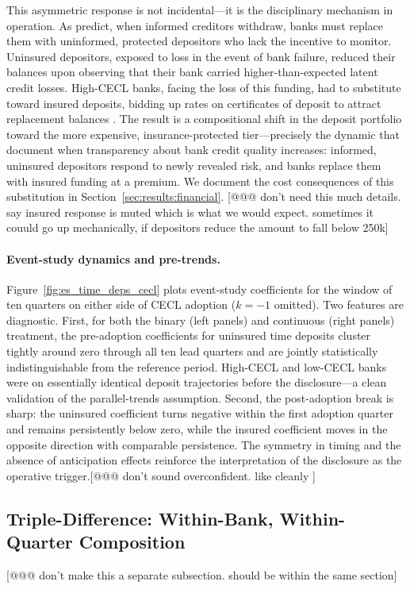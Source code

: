 This asymmetric response is not incidental---it is the disciplinary mechanism in
operation.  As \citet{calomiris1991role} predict, when informed creditors
withdraw, banks must replace them with uninformed, protected depositors who lack
the incentive to monitor.  Uninsured depositors, exposed to loss in the event of
bank failure, reduced their balances upon observing that their bank carried
higher-than-expected latent credit losses.  High-CECL banks, facing the loss of
this funding, had to substitute toward insured deposits, bidding up rates on
certificates of deposit to attract replacement balances \citep{acharya2015crisis}.
The result is a compositional shift in the deposit portfolio toward the more
expensive, insurance-protected tier---precisely the dynamic that \citet{chen2022bank}
document when transparency about bank credit quality increases: informed,
uninsured depositors respond to newly revealed risk, and banks replace them with
insured funding at a premium.  We document the cost consequences of this
substitution in Section~\ref{sec:results:financial}. [@@@ don't need this much details. say insured response is muted which is what we would expect. sometimes it couuld go up mechanically, if depositors reduce the amount to fall below 250k]

\paragraph{Event-study dynamics and pre-trends.}
Figure~\ref{fig:es_time_deps_cecl} plots event-study coefficients for the window
of ten quarters on either side of CECL adoption ($k = -1$ omitted).  Two features
are diagnostic.  First, for both the binary (left panels) and continuous (right
panels) treatment, the pre-adoption coefficients for uninsured time deposits
cluster tightly around zero through all ten lead quarters and are jointly
statistically indistinguishable from the reference period.  High-CECL and low-CECL
banks were on essentially identical deposit trajectories before the disclosure---a
clean validation of the parallel-trends assumption.  Second, the post-adoption
break is sharp: the uninsured coefficient turns negative within the first adoption
quarter and remains persistently below zero, while the insured coefficient moves
in the opposite direction with comparable persistence.  The symmetry in timing and
the absence of anticipation effects reinforce the interpretation of the disclosure
as the operative trigger.[@@@ don't sound overconfident. like cleanly ]

\subsection{Triple-Difference: Within-Bank, Within-Quarter Composition} [@@@ don't make this a separate subsection. should be within the same section]
\label{sec:results:triple}

